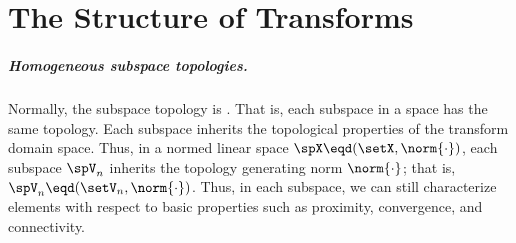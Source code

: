 ﻿%

\chapter{The Structure of Transforms}


\paragraph{Homogeneous subspace topologies.}
Normally, the subspace topology is .
That is, each subspace in a space has the same topology.
Each subspace inherits the topological properties of the transform domain space.
Thus, in a normed linear space $\spX\eqd(\setX,\norm{\cdot})$, each
subspace $\spV_n$ inherits the topology generating norm $\norm{\cdot}$;
that is, $\spV_n\eqd(\setV_n,\norm{\cdot})$.
Thus, in each subspace, we can still characterize elements with respect to
basic properties such as proximity, convergence, and connectivity.


